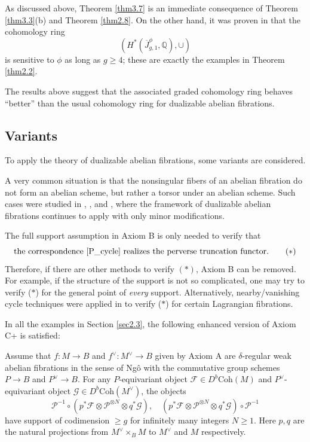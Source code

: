 \documentclass[11pt]{amsart}
\theoremstyle{plain}
\theoremstyle{definition}
\theoremstyle{remark}
\newcommand{\BQ}{{\mathbb{Q}}}
\newcommand{\CF}{{\mathcal F}}
\newcommand{\CG}{{\mathcal G}}
\newcommand{\CP}{{\mathcal P}}
\begin{document}
As discussed above, Theorem \ref{thm3.7} is an immediate consequence of Theorem \ref{thm3.3}(b) and Theorem \ref{thm2.8}. On the other hand, it was proven in \cite[Theorem 0.5]{BMSY2} that the cohomology ring
\[
\left(H^*(\overline{J}^\phi_{g,1}, \BQ), \cup \right)
\]
is sensitive to $\phi$ as long as $g\geq 4$; these are exactly the examples in Theorem \ref{thm2.2}.

The results above suggest that the associated graded cohomology ring behaves ``better'' than the usual cohomology ring for dualizable abelian fibrations.



\subsection{Variants}\label{sec3.4}

To apply the theory of dualizable abelian fibrations, some variants are considered.

\medskip 

 A very common situation is that the nonsingular fibers of an abelian fibration do not form an abelian scheme, but rather a torsor under an abelian scheme. Such cases were studied in \cite[Section 4]{MSY}, \cite{MSY2}, and \cite[Section 1]{BMSY2}, where the framework of dualizable abelian fibrations continues to apply with only minor modifications.

\medskip

 The full support assumption in Axiom B is only needed to verify that
\begin{equation*}
\textup{the correspondence \eqref{P_cycle} realizes the perverse truncation functor}.    \tag{$\ast$}
\end{equation*}
Therefore, if there are other methods to verify $(\ast)$, Axiom B can be removed. For example, if the structure of the support is not so complicated, one may try to verify ($\ast$) for the general point of \emph{every} support. Alternatively, nearby/vanishing cycle techniques were applied in \cite[Section 4]{MSY2} to verify ($\ast$) for certain Lagrangian fibrations.


\medskip 

In all the examples in Section \ref{sec2.3}, the following enhanced version of Axiom C+ is satisfied:

\noindent Assume that $f: M\to B$ and $f^\vee: M^\vee \to B$ given by Axiom A are $\delta$-regular weak abelian fibrations in the sense of Ng\^o \cite{Ngo} with the commutative group schemes $P\to B$ and $P^\vee \to B$. For any $P$-equivariant object $\CF \in D^b\mathrm{Coh}(M)$ and $P^\vee$-equivariant object $\CG \in D^b\mathrm{Coh}(M^\vee)$, the objects
\[
\CP^{-1} \circ \left(p^*\CF \otimes \CP^{\otimes N}  \otimes q^*\CG\right), \quad  \left(p^*\CF \otimes \CP^{\otimes N} \otimes q^*\CG\right)\circ \CP^{-1}
\]
have support of codimension $\geq g$ for infinitely many integers $N \geq 1$. Here $p,q$ are the natural projections from $M^\vee \times_B M$ to $M^\vee$ and $M$ respectively.
\end{document}
